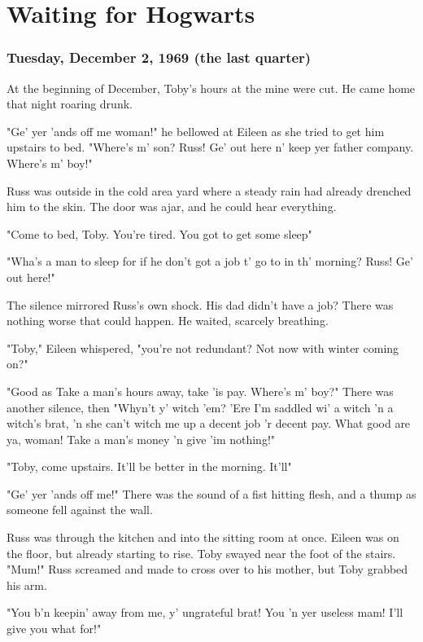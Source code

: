 
\chapter{Waiting for Hogwarts}

\subsection{Tuesday, December 2, 1969 (the last quarter)}

At the beginning of December, Toby's hours at the mine were cut. He came home that night roaring drunk.

"Ge' yer 'ands off me woman!" he bellowed at Eileen as she tried to get him upstairs to bed. "Where's m' son? Russ! Ge' out here n' keep yer father company. Where's m' boy!"

Russ was outside in the cold area yard where a steady rain had already drenched him to the skin. The door was ajar, and he could hear everything.

"Come to bed, Toby. You're tired. You got to get some sleep{\el}"

"Wha's a man to sleep for if he don't got a job t' go to in th' morning? Russ! Ge' out here!"

The silence mirrored Russ's own shock. His dad didn't have a job? There was nothing worse that could happen. He waited, scarcely breathing.

"Toby," Eileen whispered, "you're not redundant? Not now with winter coming on?"

"Good as{\el} Take a man's hours away, take 'is pay. Where's m' boy?" There was another silence, then{\el} "Whyn't y' witch 'em? 'Ere I'm saddled wi' a witch 'n a witch's brat, 'n she can't witch me up a decent job 'r decent pay. What good are ya, woman! Take a man's money 'n give 'im nothing!"

"Toby, come upstairs. It'll be better in the morning. It'll{\el}"

"Ge' yer 'ands off me!" There was the sound of a fist hitting flesh, and a thump as someone fell against the wall.

Russ was through the kitchen and into the sitting room at once. Eileen was on the floor, but already starting to rise. Toby swayed near the foot of the stairs. "Mum!" Russ screamed and made to cross over to his mother, but Toby grabbed his arm.

"You b'n keepin' away from me, y' ungrateful brat! You 'n yer useless mam! I'll give you what for!"

